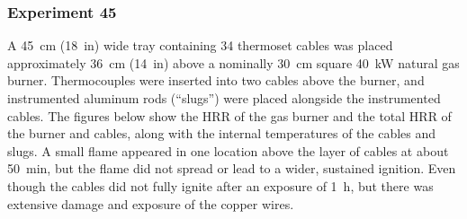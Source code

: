 \clearpage

\subsubsection{Experiment 45}

A 45~cm (18~in) wide tray containing 34 thermoset cables was placed approximately 36~cm (14~in) above a nominally 30~cm square 40~kW natural gas burner. Thermocouples were inserted into two cables above the burner, and instrumented aluminum rods (``slugs'') were placed alongside the instrumented cables. The figures below show the HRR of the gas burner and the total HRR of the burner and cables, along with the internal temperatures of the cables and slugs. A small flame appeared in one location above the layer of cables at about 50~min, but the flame did not spread or lead to a wider, sustained ignition. Even though the cables did not fully ignite after an exposure of 1~h, but there was extensive damage and exposure of the copper wires.

